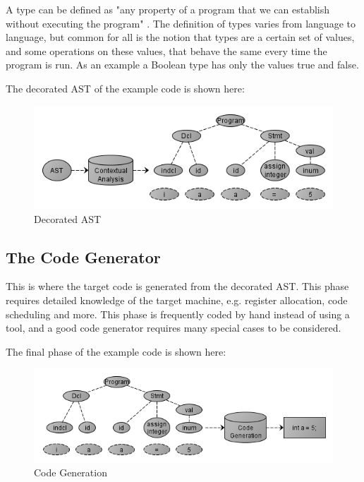 A type can be defined as "any property of a program that we can establish without executing the program" \cite{Krishnamurthi2007}. The definition of types varies from language to language, but common for all is the notion that types are a certain set of values, and some operations on these values, that behave the same every time the program is run. As an example a Boolean type has only the values true and false. 

The decorated AST of the example code is shown here:

\begin{figure}[ht]
	\centering
		\includegraphics[scale = 0.6]{img/dast.png}
	\caption{Decorated AST}
	\label{fig:dast}
\end{figure}

\subsection{The Code Generator}
This is where the target code is generated from the decorated AST. This phase requires detailed knowledge of the target machine, e.g. register allocation, code scheduling and more. This phase is frequently coded by hand instead of using a tool, and a good code generator requires many special cases to be considered.

The final phase of the example code is shown here:

\begin{figure}[ht]
	\centering
		\includegraphics[scale = 0.6]{img/codegeneration.png}
	\caption{Code Generation}
	\label{fig:codegen}
\end{figure}
